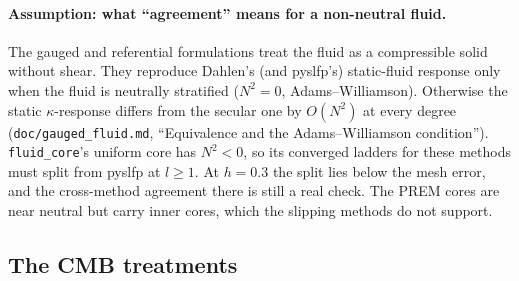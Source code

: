 \documentclass[11pt]{article}
\numberwithin{equation}{section}
\newcommand{\code}[1]{\texttt{#1}}
\begin{document}
\paragraph{Assumption: what ``agreement'' means for a non-neutral fluid.}
The gauged and referential formulations treat the fluid as a compressible
solid without shear. They reproduce Dahlen's (and pyslfp's) static-fluid
response only when the fluid is neutrally stratified ($N^2=0$,
Adams--Williamson). Otherwise the static $\kappa$-response differs from
the secular one by $O(N^2)$ at every degree (\code{doc/gauged\_fluid.md},
``Equivalence and the Adams--Williamson condition''). \code{fluid\_core}'s
uniform core has $N^2<0$, so its converged ladders for these methods must
split from pyslfp at $l\ge 1$. At $h=0.3$ the split lies below the mesh
error, and the cross-method agreement there is still a real check. The
PREM cores are near neutral but carry inner cores, which the slipping
methods do not support.

\subsection{The CMB treatments}
\label{sec:cmb}
\end{document}
